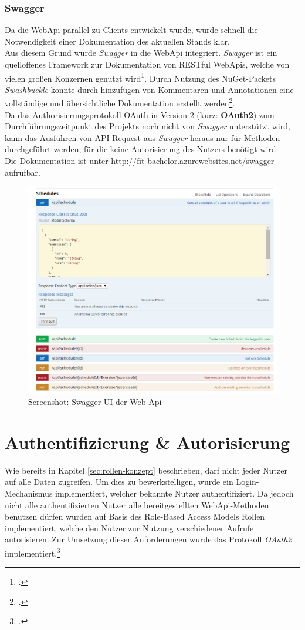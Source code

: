 \subsubsection*{Swagger}
\label{sssec:Swagger}
Da die WebApi parallel zu Clients entwickelt wurde, wurde schnell die Notwendigkeit einer Dokumentation des aktuellen Stands klar. \\
Aus diesem Grund wurde \textit{Swagger} in die WebApi integriert. \textit{Swagger} ist ein quelloffenes Framework zur Dokumentation von RESTful WebApis, welche von vielen großen Konzernen genutzt wird\footcite{swagger}. Durch Nutzung des \ac{NuGet}-Packets \textit{Swashbuckle} konnte durch hinzufügen von Kommentaren und Annotationen eine vollständige und übersichtliche Dokumentation erstellt werden\footcite{implementing-Swagger}. \\
Da das Authorisierungsprotokoll OAuth in Version 2 (kurz: \textbf{OAuth2}) zum Durchführungszeitpunkt des Projekts noch nicht von \textit{Swagger} unterstützt wird, kann das Ausführen von API-Request aus \textit{Swagger} heraus nur für Methoden durchgeführt werden, für die keine Autorisierung des Nutzers benötigt wird. \\
Die Dokumentation ist unter \href{http://fit-bachelor.azurewebsites.net/swagger}{http://fit-bachelor.azurewebsites.net/swagger} aufrufbar. 
\begin{figure}[h]
\centering
\includegraphics[width=0.8\linewidth]{content/images/Swagger-UI-fIT}
\caption{Screenshot: Swagger UI der Web Api}
\label{pic:swagger-UI}
\end{figure}


\section{Authentifizierung \& Autorisierung}
\label{sec:server-authorisierung}
Wie bereits in Kapitel \ref{sec:rollen-konzept} beschrieben, darf nicht jeder Nutzer auf alle Daten zugreifen. Um dies zu bewerkstelligen, wurde ein Login-Mechanismus implementiert, welcher bekannte Nutzer authentifiziert. Da jedoch nicht alle authentifizierten Nutzer alle bereitgestellten WebApi-Methoden benutzen dürfen wurden auf Basis des \ac{Role-Based Access Models} Rollen implementiert, welche den Nutzer zur Nutzung verschiedener Aufrufe autorisieren. Zur Umsetzung dieser Anforderungen wurde das Protokoll \textit{OAuth2} implementiert.\footcite{online:WebApi_Authorize}
